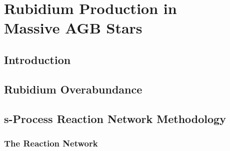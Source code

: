 \chapter[Rubidium Production in Massive AGB Stars]{\textbf{Rubidium Production in \\ Massive AGB Stars}}
\label{ch:Rb}



\section{Introduction}

\section{Rubidium Overabundance} \label{sec:Rb_Overabundance}





\section{s-Process Reaction Network Methodology}

%

\subsection{The Reaction Network}

